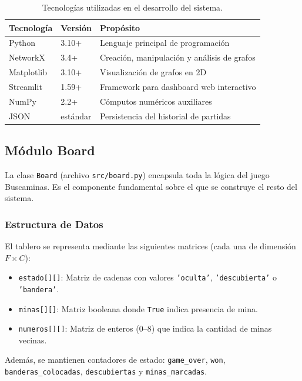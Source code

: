 \documentclass[12pt,a4paper]{article}
\begin{document}
\begin{table}[H]
\centering
\caption{Tecnologías utilizadas en el desarrollo del sistema.}
\label{tab:tecnologias}
\begin{tabular}{lll}
\toprule
\textbf{Tecnología} & \textbf{Versión} & \textbf{Propósito} \\
\midrule
Python & 3.10+ & Lenguaje principal de programación \\
NetworkX & 3.4+ & Creación, manipulación y análisis de grafos \\
Matplotlib & 3.10+ & Visualización de grafos en 2D \\
Streamlit & 1.59+ & Framework para dashboard web interactivo \\
NumPy & 2.2+ & Cómputos numéricos auxiliares \\
JSON & estándar & Persistencia del historial de partidas \\
\bottomrule
\end{tabular}
\end{table}

\subsection{Módulo Board}

La clase \texttt{Board} (archivo \texttt{src/board.py}) encapsula toda la lógica del juego Buscaminas. Es el componente fundamental sobre el que se construye el resto del sistema.

\subsubsection{Estructura de Datos}

El tablero se representa mediante las siguientes matrices (cada una de dimensión $F \times C$):

\begin{itemize}[itemsep=2pt]
    \item \texttt{estado[][]}: Matriz de cadenas con valores \texttt{'oculta'}, \texttt{'descubierta'} o \texttt{'bandera'}.
    \item \texttt{minas[][]}: Matriz booleana donde \texttt{True} indica presencia de mina.
    \item \texttt{numeros[][]}: Matriz de enteros (0--8) que indica la cantidad de minas vecinas.
\end{itemize}

Además, se mantienen contadores de estado: \texttt{game\_over}, \texttt{won}, \texttt{banderas\_colocadas}, \texttt{descubiertas} y \texttt{minas\_marcadas}.
\end{document}
